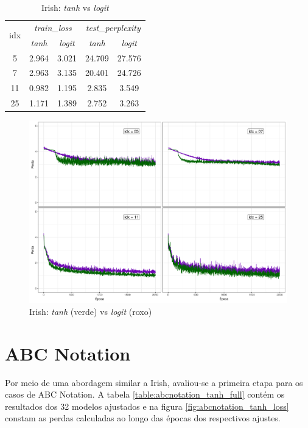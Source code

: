 \documentclass[twoside]{automatextcc}
\begin{document}
\begin{table}[H]
    \caption{Irish: \textit{tanh} vs \textit{logit}} \label{tab:irish_tanh_vs_logit}
    \centering
    \begin{tabular}{c|cc|cc}
        \toprule
        \multirow{2}{*}{idx} &
        \multicolumn{2}{c|}{\textit{train\_loss}} &
        \multicolumn{2}{c}{\textit{test\_perplexity}} \\
        & {\textit{tanh}} & {\textit{logit}} & {\textit{tanh}} & {\textit{logit}} \\
        \midrule
        5 & 2.964 & 3.021 & 24.709 & 27.576 \\
        7 & 2.963 & 3.135 & 20.401 & 24.726 \\
        11 & 0.982 & 1.195 & 2.835 & 3.549 \\
        25 & 1.171 & 1.389 & 2.752 & 3.263 \\
    \bottomrule
  \end{tabular}
\end{table}

\begin{figure}[H]
    \centering
    \includegraphics[width=\textwidth]{irish_tanh_vs_logit.pdf}
    \caption{Irish: \textit{tanh} (verde) vs \textit{logit} (roxo)}
    \label{fig:irish_tanh_vs_logit}
\end{figure}



\section{ABC Notation}
Por meio de uma abordagem similar a Irish, avaliou-se a primeira etapa para os casos de ABC Notation. A tabela \ref{table:abcnotation_tanh_full} contém os resultados dos 32 modelos ajustados e na figura \ref{fig:abcnotation_tanh_loss} constam as perdas calculadas ao longo das épocas dos respectivos ajustes.
\end{document}
